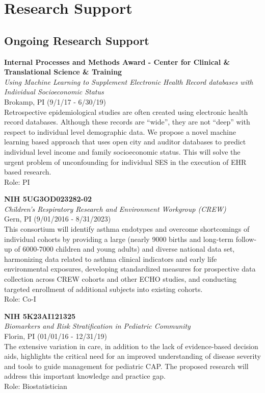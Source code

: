 \documentclass{nihbiosketch}
\begin{document}

\section{Research Support}

\subsection*{Ongoing Research Support}

\bigskip

\textbf{Internal Processes and Methods Award - Center for Clinical \&
	Translational Science \& Training}\\
\emph{Using Machine Learning to Supplement Electronic Health Record
	databases with Individual Socioeconomic Status}\\
Brokamp, PI (9/1/17 - 6/30/19)\\
Retrospective epidemiological studies are often created using electronic
health record databases. Although these records are ``wide'', they are
not ``deep'' with respect to individual level demographic data. We
propose a novel machine learning based approach that uses open city and
auditor databases to predict individual level income and family
socioeconomic status. This will solve the urgent problem of
unconfounding for individual SES in the execution of EHR based
research.\\
Role: PI

\bigskip

\textbf{NIH 5UG3OD023282-02}\\
\emph{Children's Respiratory Research and Environment Workgroup
	(CREW)}\\
Gern, PI (9/01/2016 - 8/31/2023)\\
This consortium will identify asthma endotypes and overcome shortcomings
of individual cohorts by providing a large (nearly 9000 births and
long-term follow-up of 6000-7000 children and young adults) and diverse
national data set, harmonizing data related to asthma clinical
indicators and early life environmental exposures, developing
standardized measures for prospective data collection across CREW
cohorts and other ECHO studies, and conducting targeted enrollment of
additional subjects into existing cohorts.\\
Role: Co-I

\bigskip

\textbf{NIH 5K23AI121325}\\
\emph{Biomarkers and Risk Stratification in Pediatric Community}\\
Florin, PI (01/01/16 - 12/31/19)\\
The extensive variation in care, in addition to the lack of
evidence-based decision aids, highlights the critical need for an
improved understanding of disease severity and tools to guide management
for pediatric CAP. The proposed research will address this important
knowledge and practice gap.\\
Role: Biostatistician
\end{document}
